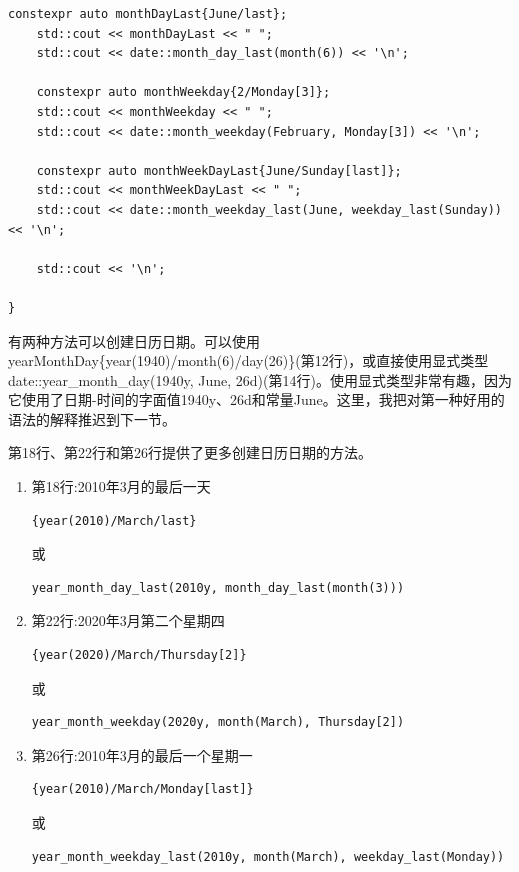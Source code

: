 \begin{lstlisting}[style=styleCXX]
	constexpr auto monthDayLast{June/last};
	std::cout << monthDayLast << " ";
	std::cout << date::month_day_last(month(6)) << '\n';
	
	constexpr auto monthWeekday{2/Monday[3]};
	std::cout << monthWeekday << " ";
	std::cout << date::month_weekday(February, Monday[3]) << '\n';
	
	constexpr auto monthWeekDayLast{June/Sunday[last]};
	std::cout << monthWeekDayLast << " ";
	std::cout << date::month_weekday_last(June, weekday_last(Sunday)) << '\n';
	
	std::cout << '\n';

}
\end{lstlisting}

有两种方法可以创建日历日期。可以使用yearMonthDay\{year(1940)/month(6)/day(26)\}(第12行)，或直接使用显式类型date::year\_month\_day(1940y, June, 26d)(第14行)。使用显式类型非常有趣，因为它使用了日期-时间的字面值1940y、26d和常量June。这里，我把对第一种好用的语法的解释推迟到下一节。

第18行、第22行和第26行提供了更多创建日历日期的方法。

\begin{enumerate}
\item 
第18行:2010年3月的最后一天
\begin{lstlisting}[style=styleCXX]
{year(2010)/March/last}
\end{lstlisting}
或
\begin{lstlisting}[style=styleCXX]
year_month_day_last(2010y, month_day_last(month(3)))
\end{lstlisting}

\item 
第22行:2020年3月第二个星期四
\begin{lstlisting}[style=styleCXX]
{year(2020)/March/Thursday[2]}
\end{lstlisting}
或
\begin{lstlisting}[style=styleCXX]
year_month_weekday(2020y, month(March), Thursday[2])
\end{lstlisting}

\item 
第26行:2010年3月的最后一个星期一
\begin{lstlisting}[style=styleCXX]
{year(2010)/March/Monday[last]}
\end{lstlisting}
或
\begin{lstlisting}[style=styleCXX]
year_month_weekday_last(2010y, month(March), weekday_last(Monday))
\end{lstlisting}
\end{enumerate}


